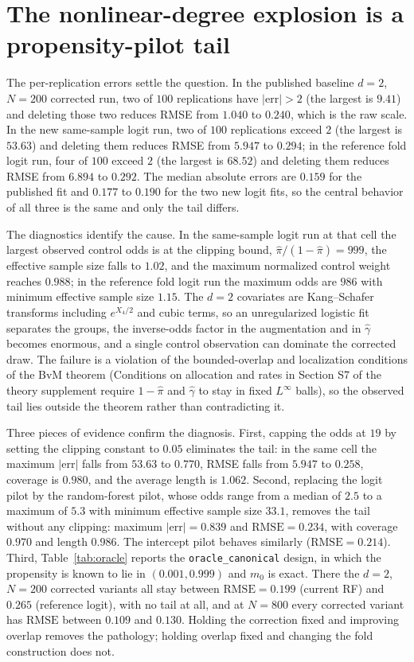 \documentclass[11pt]{article}
\begin{document}
\section{The nonlinear-degree explosion is a propensity-pilot tail}
\label{sec:tail}

The per-replication errors settle the question. In the published baseline $d=2$,
$N=200$ corrected run, two of $100$ replications have $|\mathrm{err}|>2$ (the largest is
$9.41$) and deleting those two reduces RMSE from $1.040$ to $0.240$, which is the raw
scale. In the new same-sample logit run, two of $100$ replications exceed $2$ (the
largest is $53.63$) and deleting them reduces RMSE from $5.947$ to $0.294$; in the
reference fold logit run, four of $100$ exceed $2$ (the largest is $68.52$) and deleting
them reduces RMSE from $6.894$ to $0.292$. The median absolute errors are $0.159$ for the
published fit and $0.177$ to $0.190$ for the two new logit fits, so the central behavior
of all three is the same and only the tail differs.

The diagnostics identify the cause. In the same-sample logit run at that cell the
largest observed control odds is at the clipping bound, $\widehat\pi/(1-\widehat\pi)
=999$, the effective sample size falls to $1.02$, and the maximum normalized control
weight reaches $0.988$; in the reference fold logit run the maximum odds are $986$ with
minimum effective sample size $1.15$. The $d=2$ covariates are Kang--Schafer transforms
including $e^{X_4/2}$ and cubic terms, so an unregularized logistic fit separates the
groups, the inverse-odds factor in the augmentation and in $\widehat\gamma$ becomes
enormous, and a single control observation can dominate the corrected draw. The failure
is a violation of the bounded-overlap and localization conditions of the BvM theorem
(Conditions on allocation and rates in Section S7 of the theory supplement require
$1-\widehat\pi$ and $\widehat\gamma$ to stay in fixed $L^\infty$ balls), so the observed
tail lies outside the theorem rather than contradicting it.

Three pieces of evidence confirm the diagnosis. First, capping the odds at $19$ by
setting the clipping constant to $0.05$ eliminates the tail: in the same cell the
maximum $|\mathrm{err}|$ falls from $53.63$ to $0.770$, RMSE falls from $5.947$ to
$0.258$, coverage is $0.980$, and the average length is $1.062$. Second, replacing the
logit pilot by the random-forest pilot, whose odds range from a median of $2.5$ to a
maximum of $5.3$ with minimum effective sample size $33.1$, removes the tail without any
clipping: maximum $|\mathrm{err}|=0.839$ and $\mathrm{RMSE}=0.234$, with coverage
$0.970$ and length $0.986$. The intercept pilot behaves similarly
($\mathrm{RMSE}=0.214$). Third, Table~\ref{tab:oracle} reports the
\texttt{oracle\_canonical} design, in which the propensity is known to lie in
$(0.001,0.999)$ and $m_0$ is exact. There the $d=2$, $N=200$ corrected variants all stay
between $\mathrm{RMSE}=0.199$ (current RF) and $0.265$ (reference logit), with no tail
at all, and at $N=800$ every corrected variant has $\mathrm{RMSE}$ between $0.109$ and
$0.130$. Holding the correction fixed and improving overlap removes the pathology;
holding overlap fixed and changing the fold construction does not.
\end{document}
